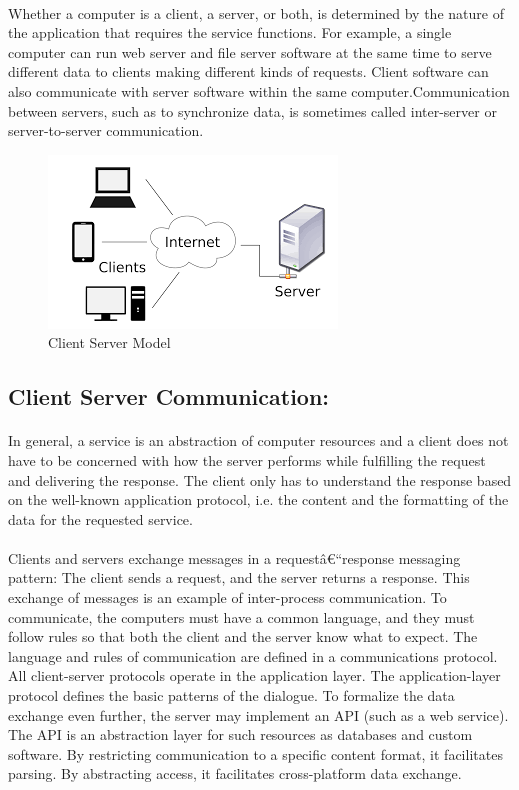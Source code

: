\documentclass[a4paper,12pt]{article}
\begin{document}
		\paragraph{} Whether a computer is a client, a server, or both, is determined by the nature of the application that requires the service functions. For example, a single computer can run web server and file server software at the same time to serve different data to clients making different kinds of requests. Client software can also communicate with server software within the same computer.Communication between servers, such as to synchronize data, is sometimes called inter-server or server-to-server communication.
		
		\begin{figure}[htb!]
			\centering
			\includegraphics{images.png}
			\caption{Client Server Model}
			\label{Client Server Model}
		\end{figure}
		
	\subsection{Client Server Communication:}
		\paragraph{} In general, a service is an abstraction of computer resources and a client does not have to be concerned with how the server performs while fulfilling the request and delivering the response. The client only has to understand the response based on the well-known application protocol, i.e. the content and the formatting of the data for the requested service.
		\paragraph{} Clients and servers exchange messages in a requestâ€“response messaging pattern: The client sends a request, and the server returns a response. This exchange of messages is an example of inter-process communication. To communicate, the computers must have a common language, and they must follow rules so that both the client and the server know what to expect. The language and rules of communication are defined in a communications protocol. All client-server protocols operate in the application layer. The application-layer protocol defines the basic patterns of the dialogue. To formalize the data exchange even further, the server may implement an API (such as a web service). The API is an abstraction layer for such resources as databases and custom software. By restricting communication to a specific content format, it facilitates parsing. By abstracting access, it facilitates cross-platform data exchange.
\end{document}
